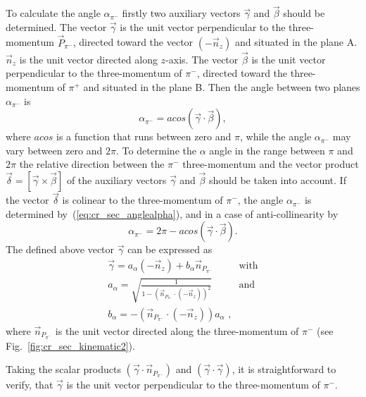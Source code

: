 \documentclass[prc,twocolumn,superscriptaddress,showpacs,amssymb,amsmath,amsfonts,linenumbers,aps]{revtex4-1}
\begin{document}
To calculate the angle $\alpha_{\pi^{-}}$ firstly two
auxiliary vectors $\vec \gamma$  and
$\vec \beta$ should be determined. The vector $\vec \gamma$ is the unit vector perpendicular to the three-momentum
$\vec P_{\pi^{-}}$, directed toward the vector $(-\vec n_{z})$ and situated in the plane A. $\vec
n_{z}$ is the unit vector directed along $z$-axis.
The vector $\vec \beta$ is the unit vector perpendicular to the three-momentum of $\pi^{-}$, 
directed toward the three-momentum of $\pi^{+}$ and situated in the plane B. 
 Then the angle between two planes  $\alpha_{\pi^{-}}$ is
\begin{equation}
\alpha_{\pi^{-}} = acos(\vec \gamma \cdot \vec \beta),
\label{eq:cr_sec_anglealpha}
\end{equation}
where $acos$ is a function that runs between zero and
$\pi$, while the angle $\alpha_{\pi^{-}}$ may vary between zero and
$2\pi$. To determine the $\alpha$ angle in the
range between $\pi$ and $2\pi$ 
the relative direction between the $\pi^{-}$ three-momentum and the vector product $\vec \delta = [ \vec \gamma \times \vec \beta ]$ of the auxiliary vectors $\vec
\gamma$ and $\vec \beta$ should be taken into account.
If the vector $\vec \delta$ is colinear to the three-momentum of $\pi^{-}$, the angle $\alpha_{\pi^{-}}$ is determined
by~(\ref{eq:cr_sec_anglealpha}), and in a case of anti-collinearity by
\begin{equation}
\alpha_{\pi^{-}} = 2\pi - acos(\vec \gamma \cdot \vec \beta).
\label{eq:cr_sec_anglealpha_var}
\end{equation}
The defined above vector $\vec \gamma$ can be expressed as
\begin{eqnarray}
\vec \gamma = a_{\alpha}(-\vec n_{z}) + b_{\alpha}\vec n_{P_{\pi^{-}}} & \text{with} \nonumber \\
a_{\alpha} = \sqrt{\frac{1}{1 - (\vec n_{P_{\pi^{-}}} \cdot (-\vec n_{z} ) )^{2}}} & \text{and} \label{alphavec}\\
b_{\alpha} = - (\vec n_{P_{\pi^{-}}} \cdot (-\vec n_{z} ) ) a_{\alpha} \textrm{ ,} \nonumber
\end{eqnarray} 
where $\vec n_{P_{\pi^{-}}}$ is the unit vector directed along the three-momentum of $\pi^{-}$ (see Fig.~\ref{fig:cr_sec_kinematic2}).

Taking the scalar products $(\vec \gamma \cdot \vec
n_{P_{\pi^{-}}})$ and $(\vec \gamma \cdot \vec  \gamma)$,
it is straightforward to verify, that $\vec \gamma$ is the unit vector perpendicular to the three-momentum of $\pi^{-}$.
\end{document}

